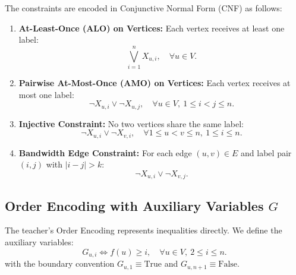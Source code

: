 \documentclass[a4paper,fleqn]{cas-sc}
\begin{document}
The constraints are encoded in Conjunctive Normal Form (CNF) as follows:
\begin{enumerate}
    \item \textbf{At-Least-Once (ALO) on Vertices:} Each vertex receives at least one label:
    \begin{equation}
    \bigvee_{i=1}^n X_{u, i}, \quad \forall u \in V.
    \end{equation}
    \item \textbf{Pairwise At-Most-Once (AMO) on Vertices:} Each vertex receives at most one label:
    \begin{equation}
    \neg X_{u, i} \lor \neg X_{u, j}, \quad \forall u \in V, \ 1 \le i < j \le n.
    \end{equation}
    \item \textbf{Injective Constraint:} No two vertices share the same label:
    \begin{equation}
    \neg X_{u, i} \lor \neg X_{v, i}, \quad \forall 1 \le u < v \le n, \ 1 \le i \le n.
    \end{equation}
    \item \textbf{Bandwidth Edge Constraint:} For each edge $(u, v) \in E$ and label pair $(i, j)$ with $|i - j| > k$:
    \begin{equation}
    \neg X_{u, i} \lor \neg X_{v, j}.
    \end{equation}
\end{enumerate}

\subsection{Order Encoding with Auxiliary Variables $G$}
The teacher's Order Encoding represents inequalities directly. We define the auxiliary variables:
\begin{equation}
G_{u, i} \iff f(u) \ge i, \quad \forall u \in V, \ 2 \le i \le n.
\end{equation}
with the boundary convention $G_{u, 1} \equiv \text{True}$ and $G_{u, n+1} \equiv \text{False}$.
\end{document}
